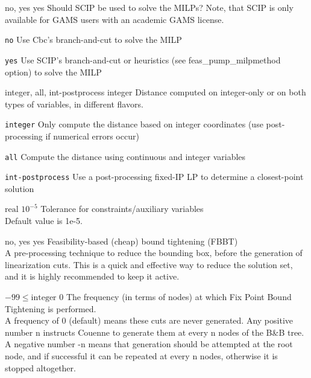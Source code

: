 %
{\ttfamily no, yes}%
{yes}%
{Should SCIP be used to solve the MILPs?
 Note, that SCIP is only available for GAMS users with an academic GAMS license.}%
{\begin{list}{}{
\setlength{\parsep}{0em}
\setlength{\leftmargin}{5ex}
\setlength{\labelwidth}{2ex}
\setlength{\itemindent}{0ex}
\setlength{\topsep}{0pt}}
\item[\texttt{no}] Use Cbc's branch-and-cut to solve the MILP
\item[\texttt{yes}] Use SCIP's branch-and-cut or heuristics (see feas\_pump\_milpmethod option) to solve the MILP
\end{list}
}

%
{\ttfamily integer, all, int-postprocess}%
{integer}%
{Distance computed on integer-only or on both types of variables, in different flavors.}%
{\begin{list}{}{
\setlength{\parsep}{0em}
\setlength{\leftmargin}{5ex}
\setlength{\labelwidth}{2ex}
\setlength{\itemindent}{0ex}
\setlength{\topsep}{0pt}}
\item[\texttt{integer}] Only compute the distance based on integer coordinates (use post-processing if numerical errors occur)
\item[\texttt{all}] Compute the distance using continuous and integer variables
\item[\texttt{int-postprocess}] Use a post-processing fixed-IP LP to determine a closest-point solution
\end{list}
}

%
{$\textrm{real}$}%
{$10^{- 5}$}%
{Tolerance for constraints/auxiliary variables\\
Default value is 1e-5.}%
{}

%
{\ttfamily no, yes}%
{yes}%
{Feasibility-based (cheap) bound tightening (FBBT)\\
A pre-processing technique to reduce the bounding box, before the generation of linearization cuts. This is a quick and effective way to reduce the solution set, and it is highly recommended to keep it active.}%
{}

%
{$-99\leq\textrm{integer}$}%
{$0$}%
{The frequency (in terms of nodes) at which Fix Point Bound Tightening is performed.\\
A frequency of 0 (default) means these cuts are never generated. Any positive number n instructs Couenne to generate them at every n nodes of the B\&B tree. A negative number -n means that generation should be attempted at the root node, and if successful it can be repeated at every n nodes, otherwise it is stopped altogether.}%
{}

